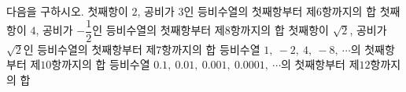 다음을 구하시오.
 첫째항이 $2$, 공비가 $3$인 등비수열의 첫째항부터 제$6$항까지의 합
 첫째항이 $4$, 공비가 $-\dfrac{1}{2}$인 등비수열의 첫째항부터 제$8$항까지의 합
 첫째항이 $\sqrt{2}$, 공비가 $\sqrt{2}$인 등비수열의 첫째항부터 제$7$항까지의 합
 등비수열 $1,\ -2,\ 4,\ -8,\ \cdots$의 첫째항부터 제$10$항까지의 합
 등비수열 $0.1,\ 0.01,\ 0.001,\ 0.0001,\ \cdots$의 첫째항부터 제$12$항까지의 합
